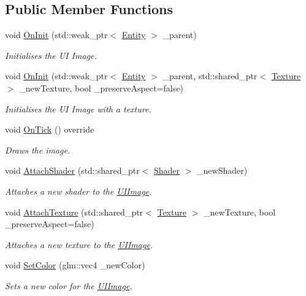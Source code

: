 \subsection*{Public Member Functions}
\begin{DoxyCompactItemize}
\item 
void \hyperlink{classfrontier_1_1_u_i_image_ad862e7dd5bcd1c2847001f5e1b56c114}{On\+Init} (std\+::weak\+\_\+ptr$<$ \hyperlink{classfrontier_1_1_entity}{Entity} $>$ \+\_\+parent)
\begin{DoxyCompactList}\small\item\em Initialises the UI Image. \end{DoxyCompactList}\item 
void \hyperlink{classfrontier_1_1_u_i_image_a0f5014ae8334ecb692c34c1645a3c6be}{On\+Init} (std\+::weak\+\_\+ptr$<$ \hyperlink{classfrontier_1_1_entity}{Entity} $>$ \+\_\+parent, std\+::shared\+\_\+ptr$<$ \hyperlink{classfrontier_1_1_texture}{Texture} $>$ \+\_\+new\+Texture, bool \+\_\+preserve\+Aspect=false)
\begin{DoxyCompactList}\small\item\em Initialises the UI Image with a texture. \end{DoxyCompactList}\item 
void \hyperlink{classfrontier_1_1_u_i_image_a4e0d055c0add55fa5e63ae892ea59498}{On\+Tick} () override
\begin{DoxyCompactList}\small\item\em Draws the image. \end{DoxyCompactList}\item 
void \hyperlink{classfrontier_1_1_u_i_image_a6e734a2bc1ab3869dbed9ad0161db03e}{Attach\+Shader} (std\+::shared\+\_\+ptr$<$ \hyperlink{classfrontier_1_1_shader}{Shader} $>$ \+\_\+new\+Shader)
\begin{DoxyCompactList}\small\item\em Attaches a new shader to the \hyperlink{classfrontier_1_1_u_i_image}{U\+I\+Image}. \end{DoxyCompactList}\item 
void \hyperlink{classfrontier_1_1_u_i_image_a4a01988dfb00993a7e22de94bddb41ce}{Attach\+Texture} (std\+::shared\+\_\+ptr$<$ \hyperlink{classfrontier_1_1_texture}{Texture} $>$ \+\_\+new\+Texture, bool \+\_\+preserve\+Aspect=false)
\begin{DoxyCompactList}\small\item\em Attaches a new texture to the \hyperlink{classfrontier_1_1_u_i_image}{U\+I\+Image}. \end{DoxyCompactList}\item 
void \hyperlink{classfrontier_1_1_u_i_image_a4d6851a91889ce7815a8697f9bc42126}{Set\+Color} (glm\+::vec4 \+\_\+new\+Color)
\begin{DoxyCompactList}\small\item\em Sets a new color for the \hyperlink{classfrontier_1_1_u_i_image}{U\+I\+Image}. \end{DoxyCompactList}\end{DoxyCompactItemize}
